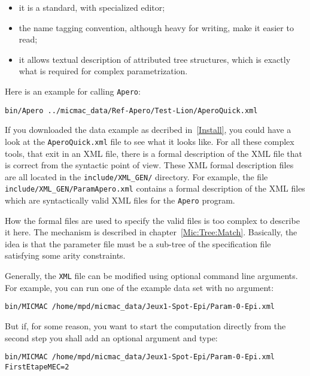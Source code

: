 \begin{itemize}
    \item it is a standard, with  specialized editor;
    \item the name tagging convention, although heavy for writing, make it easier to read;
    \item it allows textual description of attributed tree structures, which is
          exactly what is required for complex parametrization.
\end{itemize}

Here is an example for calling {\tt Apero}: 

\begin{verbatim}
bin/Apero ../micmac_data/Ref-Apero/Test-Lion/AperoQuick.xml
\end{verbatim}

If you downloaded the data example as decribed in~\ref{Install}, you could have
a look at the {\tt AperoQuick.xml} file to see what it looks like. For all these
complex tools, that exit in an  XML file, there is a formal description of the 
XML file that is correct from the syntactic point of view. These XML formal description
files are all  located in the {\tt include/XML\_GEN/} directory.
For example, the file {\tt include/XML\_GEN/ParamApero.xml} contains a formal
description of the XML files which are syntactically valid XML files for the 
{\tt Apero} program.

How the formal files are used to specify the valid files is too complex
to describe it here. The mechanism is described in chapter~\ref{Mic:Tree:Match}.
Basically, the idea is that the parameter file
must be a sub-tree of the specification file satisfying some arity
constraints.


Generally, the {\tt XML} file can be modified using optional command line
arguments. For example, you can run one of the example data set with no
argument:

\begin{verbatim}
bin/MICMAC /home/mpd/micmac_data/Jeux1-Spot-Epi/Param-0-Epi.xml 
\end{verbatim}

But if, for some reason, you want to start the computation directly
from the second step you shall add an optional argument and type:

\begin{verbatim}
bin/MICMAC /home/mpd/micmac_data/Jeux1-Spot-Epi/Param-0-Epi.xml  FirstEtapeMEC=2
\end{verbatim}


